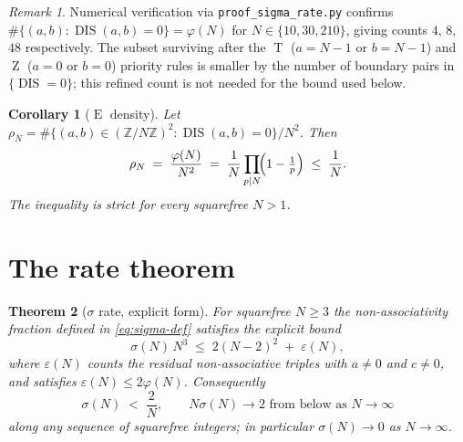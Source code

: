 \documentclass[11pt,reqno]{amsart}
\theoremstyle{plain}
\newtheorem{theorem}{Theorem}
\newtheorem{corollary}[theorem]{Corollary}
\theoremstyle{definition}
\theoremstyle{remark}
\newtheorem*{remark}{Remark}
\DeclareMathOperator{\DIS}{DIS}
\DeclareMathOperator{\ECHO}{E}
\DeclareMathOperator{\HARM}{T}
\DeclareMathOperator{\VOID}{Z}
\newcommand{\ZN}{\mathbb{Z}/N\mathbb{Z}}
\begin{document}
\begin{remark}
Numerical verification via \texttt{proof\_sigma\_rate.py} confirms
$\#\{(a,b):\DIS(a,b)=0\}=\varphi(N)$ for
$N\in\{10,30,210\}$, giving counts $4$, $8$, $48$ respectively.
The subset surviving after the $\HARM$ ($a=N-1$ or $b=N-1$) and
$\VOID$ ($a=0$ or $b=0$) priority rules is smaller by the number of
boundary pairs in $\{\DIS=0\}$; this refined count is not needed for
the bound used below.
\end{remark}

\begin{corollary}[$\ECHO$ density]\label{cor:echo-density}
Let $\rho_N=\#\{(a,b)\in(\ZN)^{2}:\DIS(a,b)=0\}/N^{2}$. Then
\begin{equation}\label{eq:rho}
  \rho_N\;=\;\frac{\varphi(N)}{N^{2}}
  \;=\;\frac{1}{N}\prod_{p\mid N}\!\Bigl(1-\tfrac{1}{p}\Bigr)
  \;\le\;\frac{1}{N}.
\end{equation}
The inequality is strict for every squarefree $N>1$.
\end{corollary}

\section{The rate theorem}\label{sec:rate}

\begin{theorem}[$\sigma$ rate, explicit form]\label{thm:rate}
For squarefree $N\ge 3$ the non-associativity fraction defined in
\eqref{eq:sigma-def} satisfies the explicit bound
\begin{equation}\label{eq:rate}
  \sigma(N)\,N^{3}\;\le\;2(N-2)^{2}\;+\;\varepsilon(N),
\end{equation}
where $\varepsilon(N)$ counts the residual non-associative triples
with $a\neq 0$ \emph{and} $c\neq 0$, and satisfies
$\varepsilon(N)\le 2\varphi(N)$. Consequently
\begin{equation}\label{eq:rate-asymptotic}
  \sigma(N)\;<\;\frac{2}{N},
  \qquad N\sigma(N)\to 2 \text{ from below as } N\to\infty
\end{equation}
along any sequence of squarefree integers; in particular
$\sigma(N)\to 0$ as $N\to\infty$.
\end{theorem}
\end{document}
